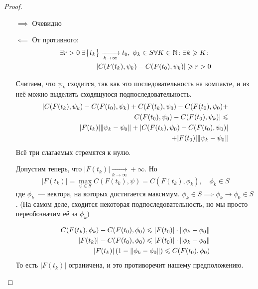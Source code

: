 \begin{proof}
    \begin{itemize}
        \item[$\implies$] Очевидно
        \item[$\impliedby$] От противного:
        \begin{align}
            \exists r > 0\; \exists \bigl\{ t_k \bigr\} \xrightarrow[k \to \infty]{} t_0, \; \psi_k \in S \forall K \in \mathbb{N}\colon \exists k \geqslant K\colon\\
            |C(F(t_k), \psi_k) - C(F(t_0), \psi_k)| \geqslant r > 0
        \end{align} 

        Считаем, что $\psi_k$ сходится, так как это последовательность на компакте, и из неё можно выделить сходящуюся подпоследовательность.
        \begin{align*}
            |C(F(t_k), \psi_k) - C(F(t_0), \psi_k) + C(F(t_k), \psi_0) - C(F(t_0), \psi_0) + \\
            C(F(t_0), \psi_0) - C(F(t_0), \psi_k)| \leqslant \\
            |F(t_k)| \lVert \psi_k - \psi_0 \rVert + |C(F(t_k), \psi_0) - C(F(t_0), \psi_0)|  \\ + 
            |F(t_0)| \lVert \psi_k - \psi_0 \rVert
        \end{align*}
        Всё три слагаемых стремятся к нулю.

        Допустим теперь, что $|F(t_k)| \xrightarrow[k \to \infty]{} +\infty$.
        Но 
        \begin{equation*}
            |F(t_k)| = \max\limits_{\psi \in S} C(F(t_k), \psi) = 
            C(F(t_k), \phi_k), \quad \phi_k \in S
        \end{equation*}
        где $\phi_k$~--- вектора, на которых достигается максимум.
        $\phi_k \in S \implies \phi_k \to \phi_0 \in S$.
        (На самом деле, сходится некоторая подпоследовательность, но мы просто переобозначим её за $\phi_k$)

        \begin{align*}
            C(F(t_k), \phi_k) - C(F(t_0), \phi_0) \leqslant |F(t_0)| \cdot \lVert \phi_k - \phi_0 \rVert \\
            |F(t_k)| - C(F(t_0), \phi_0) \leqslant |F(t_0)| \cdot \lVert \phi_k - \phi_0 \rVert \\
            |F(t_k)|\left( 1 - \lVert \phi_k - \phi_0 \rVert  \right) \leqslant C(F(t_0), \phi_0)  
        \end{align*}
        То есть $|F(t_k)|$ ограничена, и это противоречит нашему предположению.
    \end{itemize}
\end{proof}

